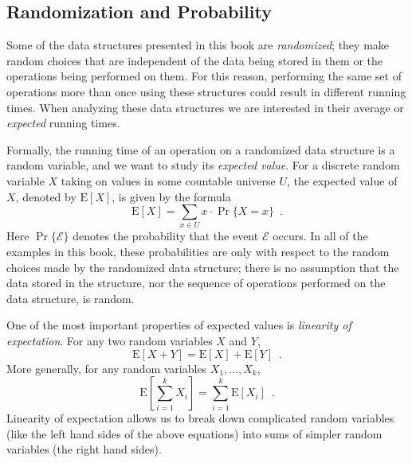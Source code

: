 \documentclass[10pt]{book}
\newcommand{\seclabel}[1]{\label{sec:#1}}
\theoremstyle{plain}
\theoremstyle{definition}
\newcommand{\E}{\mathrm{E}}
\begin{document}
\subsection{Randomization and Probability}
\seclabel{randomization}

%
%
%
%
Some of the data structures presented in this book are \emph{randomized};
they make random choices that are independent of the data being stored
in them or the operations being performed on them.  For this reason,
performing the same set of operations more than once using these
structures could result in different running times.  When analyzing these
data structures we are interested in their average or \emph{expected}
running times.
%
%

Formally, the running time of an operation on a randomized data structure
is a random variable, and we want to study its \emph{expected value}.
%
For
a discrete random variable $X$ taking on values in some countable
universe $U$, the expected value of $X$, denoted by $\E[X]$, is given
by the formula
\[
    \E[X] = \sum_{x\in U} x\cdot\Pr\{X=x\} \enspace .
\]
Here $\Pr\{\mathcal{E}\}$ denotes the probability that the event
$\mathcal{E}$ occurs.  In all of the examples in this book, these
probabilities are only with respect to the random choices made by the
randomized data structure;  there is no assumption that the data stored
in the structure, nor the sequence of operations performed on the
data structure, is random.

One of the most important properties of expected values is \emph{linearity
of expectation}.
%
For any two random variables $X$ and $Y$,
\[
   \E[X+Y] = \E[X] + \E[Y] \enspace .
\]
More generally, for any random variables $X_1,\ldots,X_k$,
\[
   \E\left[\sum_{i=1}^k X_i\right] = \sum_{i=1}^k \E[X_i] \enspace .
\]
Linearity of expectation allows us to break down complicated random variables (like the left hand sides of the above equations) into sums of simpler random variables (the right hand sides).
\end{document}
